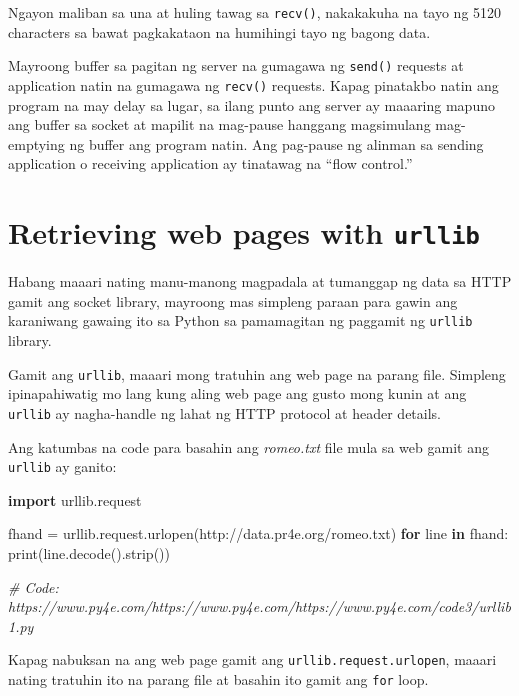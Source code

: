 \documentclass[10pt,]{book}
\newenvironment{Shaded}{}{}
\newcommand{\BuiltInTok}[1]{\textcolor[rgb]{0.00,0.50,0.00}{#1}}
\newcommand{\CommentTok}[1]{\textcolor[rgb]{0.38,0.63,0.69}{\textit{#1}}}
\newcommand{\ControlFlowTok}[1]{\textcolor[rgb]{0.00,0.44,0.13}{\textbf{#1}}}
\newcommand{\ImportTok}[1]{\textcolor[rgb]{0.00,0.50,0.00}{\textbf{#1}}}
\newcommand{\KeywordTok}[1]{\textcolor[rgb]{0.00,0.44,0.13}{\textbf{#1}}}
\newcommand{\NormalTok}[1]{#1}
\newcommand{\OperatorTok}[1]{\textcolor[rgb]{0.40,0.40,0.40}{#1}}
\newcommand{\StringTok}[1]{\textcolor[rgb]{0.25,0.44,0.63}{#1}}
\begin{document}
Ngayon maliban sa una at huling tawag sa \texttt{recv()}, nakakakuha na
tayo ng 5120 characters sa bawat pagkakataon na humihingi tayo ng bagong
data.

Mayroong buffer sa pagitan ng server na gumagawa ng \texttt{send()}
requests at application natin na gumagawa ng \texttt{recv()} requests.
Kapag pinatakbo natin ang program na may delay sa lugar, sa ilang punto
ang server ay maaaring mapuno ang buffer sa socket at mapilit na
mag-pause hanggang magsimulang mag-emptying ng buffer ang program natin.
Ang pag-pause ng alinman sa sending application o receiving application
ay tinatawag na ``flow control.''


\section{\texorpdfstring{Retrieving web pages with
\texttt{urllib}}{Retrieving web pages with urllib}}\label{retrieving-web-pages-with-urllib}

Habang maaari nating manu-manong magpadala at tumanggap ng data sa HTTP
gamit ang socket library, mayroong mas simpleng paraan para gawin ang
karaniwang gawaing ito sa Python sa pamamagitan ng paggamit ng
\texttt{urllib} library.

Gamit ang \texttt{urllib}, maaari mong tratuhin ang web page na parang
file. Simpleng ipinapahiwatig mo lang kung aling web page ang gusto mong
kunin at ang \texttt{urllib} ay nagha-handle ng lahat ng HTTP protocol
at header details.

Ang katumbas na code para basahin ang \emph{romeo.txt} file mula sa web
gamit ang \texttt{urllib} ay ganito:

\begin{Shaded}
\begin{Highlighting}[]
\ImportTok{import}\NormalTok{ urllib.request}

\NormalTok{fhand }\OperatorTok{=}\NormalTok{ urllib.request.urlopen(}\StringTok{\textquotesingle{}http://data.pr4e.org/romeo.txt\textquotesingle{}}\NormalTok{)}
\ControlFlowTok{for}\NormalTok{ line }\KeywordTok{in}\NormalTok{ fhand:}
    \BuiltInTok{print}\NormalTok{(line.decode().strip())}

\CommentTok{\# Code: https://www.py4e.com/https://www.py4e.com/https://www.py4e.com/code3/urllib1.py}
\end{Highlighting}
\end{Shaded}

Kapag nabuksan na ang web page gamit ang
\texttt{urllib.request.urlopen}, maaari nating tratuhin ito na parang
file at basahin ito gamit ang \texttt{for} loop.
\end{document}
